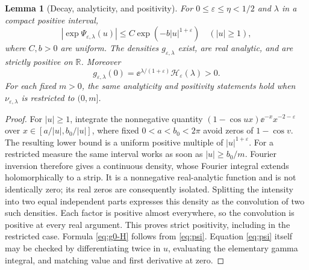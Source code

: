 \documentclass[11pt,a4paper]{article}
\numberwithin{equation}{section}
\newtheorem{lemma}[theorem]{Lemma}
\theoremstyle{definition}
\theoremstyle{remark}
\newcommand{\R}{\mathbb R}\newcommand{\C}{\mathbb C}
\newcommand{\ep}{\varepsilon}\newcommand{\la}{\lambda}
\newcommand{\HH}{\mathcal H}\newcommand{\RR}{\mathcal R}
\begin{document}
\begin{lemma}[Decay, analyticity, and positivity]\label{lem:density}
For \(0\le\ep\le\eta<1/2\) and \(\la\) in a compact positive interval,
\[
 |\exp\Psi_{\ep,\la}(u)|\le C\exp(-b|u|^{1+\ep})
 \quad (|u|\ge1),
\]
where \(C,b>0\) are uniform. The densities \(g_{\ep,\la}\) exist, are
real analytic, and are strictly positive on \(\R\). Moreover
\begin{equation}\label{eq:g0-H}
 g_{\ep,\la}(0)=\ee^{\la/(1+\ep)}\HH_\ep(\la)>0.
\end{equation}
For each fixed \(m>0\), the same analyticity and positivity statements
hold when \(\nu_{\ep,\la}\) is restricted to \((0,m]\).
\end{lemma}
\begin{proof}
For \(|u|\ge1\), integrate the nonnegative quantity
\((1-\cos ux)\ee^{-x}x^{-2-\ep}\) over
\(x\in[a/|u|,b_0/|u|]\), where fixed
\(0<a<b_0<2\pi\) avoid zeros of \(1-\cos v\).
The resulting lower bound is a uniform positive multiple of
\(|u|^{1+\ep}\). For a restricted measure the same interval works as
soon as \(|u|\ge b_0/m\). Fourier inversion therefore gives a continuous
density, whose Fourier integral extends holomorphically to a strip.
It is a nonnegative real-analytic function and is not identically zero;
its real zeros are consequently isolated. Splitting the intensity into
two equal independent parts expresses this density as the convolution
of two such densities. Each factor is positive almost everywhere, so
the convolution is positive at every real argument. This proves strict
positivity, including in the restricted case. Formula \eqref{eq:g0-H}
follows from \eqref{eq:psi}. Equation \eqref{eq:psi} itself may be checked
by differentiating twice in \(u\), evaluating the elementary gamma
integral, and matching value and first derivative at zero.
\end{proof}
\end{document}
